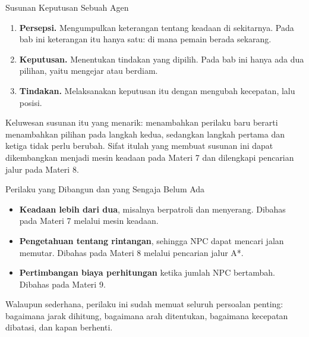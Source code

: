 \documentclass[aspectratio=169,10pt]{beamer}
\begin{document}
\begin{frame}{Susunan Keputusan Sebuah Agen}
\begin{enumerate}
  \item \textbf{Persepsi.} Mengumpulkan keterangan tentang keadaan di
        sekitarnya. Pada bab ini keterangan itu hanya satu: di mana pemain
        berada sekarang.
  \item \textbf{Keputusan.} Menentukan tindakan yang dipilih. Pada bab ini
        hanya ada dua pilihan, yaitu mengejar atau berdiam.
  \item \textbf{Tindakan.} Melaksanakan keputusan itu dengan mengubah
        kecepatan, lalu posisi.
\end{enumerate}
\vspace{0.16cm}
\begin{kotak}
Keluwesan susunan itu yang menarik: menambahkan perilaku baru berarti
menambahkan pilihan pada langkah kedua, sedangkan langkah pertama dan ketiga
tidak perlu berubah. Sifat itulah yang membuat susunan ini dapat dikembangkan
menjadi mesin keadaan pada Materi 7 dan dilengkapi pencarian jalur pada
Materi 8.
\end{kotak}
\end{frame}

\begin{frame}{Perilaku yang Dibangun dan yang Sengaja Belum Ada}
\begin{itemize}
  \item \textbf{Keadaan lebih dari dua}, misalnya berpatroli dan menyerang.
        Dibahas pada Materi 7 melalui mesin keadaan.
  \item \textbf{Pengetahuan tentang rintangan}, sehingga NPC dapat mencari
        jalan memutar. Dibahas pada Materi 8 melalui pencarian jalur A*.
  \item \textbf{Pertimbangan biaya perhitungan} ketika jumlah NPC bertambah.
        Dibahas pada Materi 9.
\end{itemize}
\vspace{0.16cm}
\begin{kotak}
Walaupun sederhana, perilaku ini sudah memuat seluruh persoalan penting:
bagaimana jarak dihitung, bagaimana arah ditentukan, bagaimana kecepatan
dibatasi, dan kapan berhenti.
\end{kotak}
\end{frame}
\end{document}
